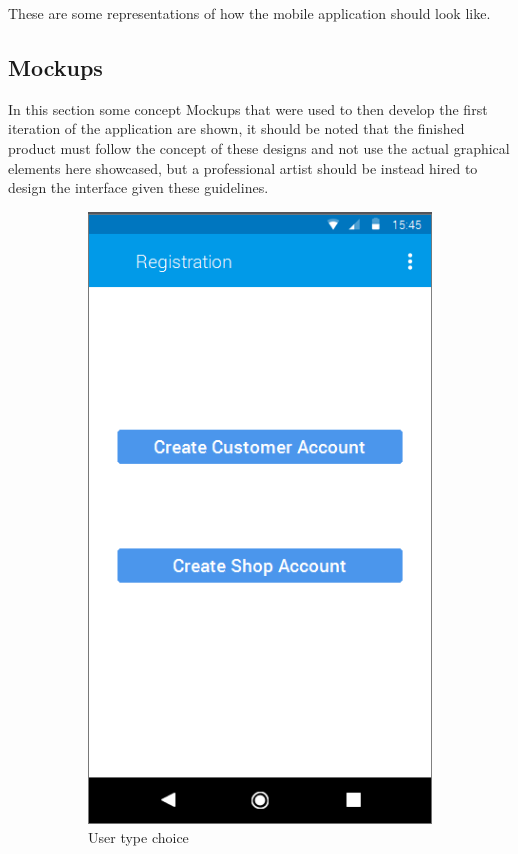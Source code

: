 These are some representations of how the mobile application should look like.\\ 
\subsection{Mockups}
In this section some concept Mockups that were used to then develop the first iteration of the application are shown, it should be noted that the finished product must follow the concept of these designs and not use the actual graphical elements here showcased, but a professional artist should be instead hired to design the interface given these guidelines.

\begin{figure}[h]
\centering
\begin{subfigure}{.5\textwidth}
  \centering
  \includegraphics[height=.4\textheight, keepaspectratio=true]{Img/Mockup_Registration}
  \caption{User type choice}
\end{subfigure}%
\begin{subfigure}{.5\textwidth}

\end{subfigure}
\end{figure}
